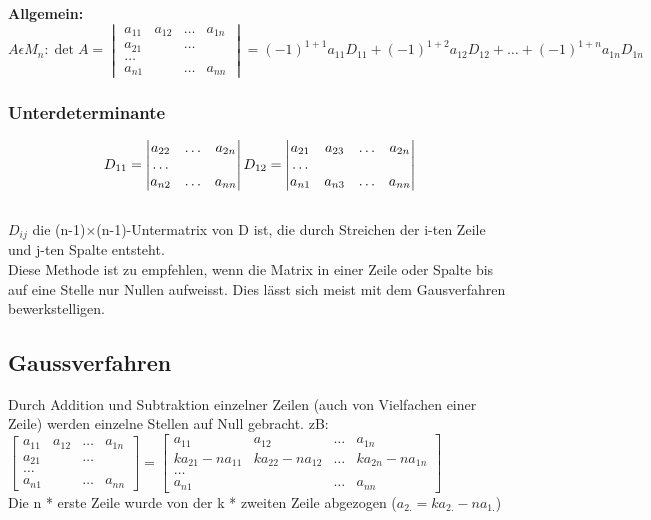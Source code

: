 	\textbf{Allgemein:}
	$$A\epsilon M_n: \det A =    
	\begin{vmatrix}
    	a_{11} & a_{12}& \ldots & a_{1n}\\
    	a_{21}& &\ldots & \\
    	\ldots \\
    	a_{n1} & & \ldots & a_{nn}    			
    \end{vmatrix}=
	(-1)^{1+1}a_{11}D_{11} + (-1)^{1+2}a_{12}D_{12}+ \ldots +
	(-1)^{1+n}a_{1n}D_{1n}$$
	
	\subsubsection{Unterdeterminante}
	$$D_{11}=
	\begin{vmatrix}
    	a_{22} & \ldots & a_{2n}\\
    	\ldots\\
    	a_{n2}& \ldots & a_{nn}
    \end{vmatrix} 	\\
	D_{12}=
	\begin{vmatrix}
    	a_{21} & a_{23}& \ldots & a_{2n}\\
    	\ldots\\
    	a_{n1}& a_{n3}&\ldots & a_{nn}
    \end{vmatrix}$$\\
	$D_{ij}$ die (n-1)$ \times $(n-1)-Untermatrix von D ist, die durch Streichen der
	i-ten Zeile und j-ten Spalte entsteht.\\
	Diese Methode ist zu empfehlen, wenn die Matrix in einer Zeile oder Spalte
	bis auf eine Stelle nur Nullen aufweisst.
	Dies lässt sich meist mit dem Gausverfahren bewerkstelligen.
	
\subsection{Gaussverfahren}
	Durch Addition und Subtraktion einzelner Zeilen (auch von Vielfachen einer
	Zeile) werden einzelne Stellen auf Null gebracht. zB:\\
	$\begin{bmatrix}
    	a_{11} & a_{12}& \ldots & a_{1n}\\
    	a_{21}& &\ldots & \\
    	\ldots \\
    	a_{n1} & & \ldots & a_{nn}    			
    \end{bmatrix}=
	\begin{bmatrix}
    	a_{11} & a_{12}& \ldots & a_{1n}\\
    	k a_{21}-n a_{11}& ka_{22}-n a_{12}&\ldots & k a_{2n} - n a_{1n}\\
    	\ldots \\
    	a_{n1} & & \ldots & a_{nn}    			
    \end{bmatrix}$ \\
	Die n * erste Zeile wurde von der k * zweiten Zeile abgezogen ($a_{2.}= 
	k a_{2.}- n a_{1.}$)
	

